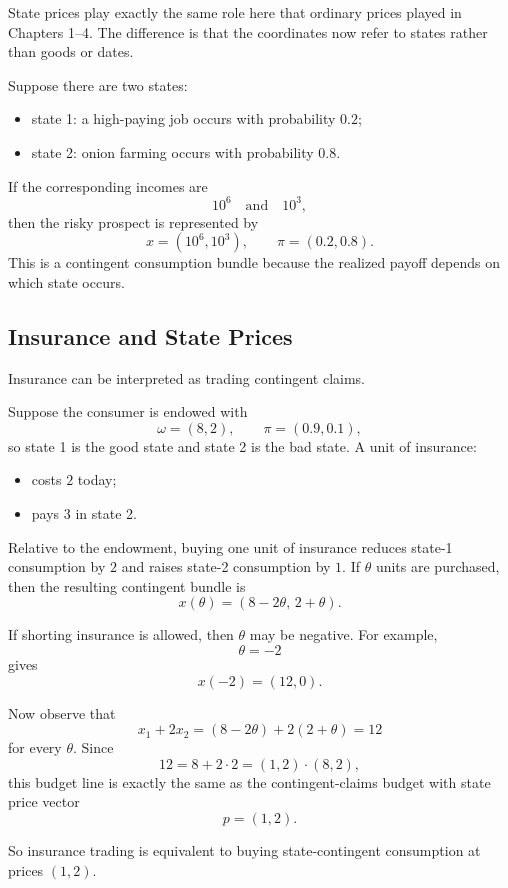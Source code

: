 State prices play exactly the same role here that ordinary prices played in Chapters 1--4. The difference is that the coordinates now refer to states rather than goods or dates.

\begin{examplebox}[title={Worked Example: contingent consumption from an uncertain career outcome}]
Suppose there are two states:
\begin{itemize}
    \item state 1: a high-paying job occurs with probability $0.2$;
    \item state 2: onion farming occurs with probability $0.8$.
\end{itemize}
If the corresponding incomes are
\[
10^6 \quad \text{and} \quad 10^3,
\]
then the risky prospect is represented by
\[
x=(10^6,10^3),
\qquad
\pi=(0.2,0.8).
\]
This is a contingent consumption bundle because the realized payoff depends on which state occurs.
\end{examplebox}

\subsection{Insurance and State Prices}

Insurance can be interpreted as trading contingent claims.

\begin{examplebox}[title={Worked Example: insurance as contingent consumption}]
Suppose the consumer is endowed with
\[
\omega=(8,2),
\qquad
\pi=(0.9,0.1),
\]
so state 1 is the good state and state 2 is the bad state. A unit of insurance:
\begin{itemize}
    \item costs $2$ today;
    \item pays $3$ in state 2.
\end{itemize}

Relative to the endowment, buying one unit of insurance reduces state-1 consumption by $2$ and raises state-2 consumption by $1$. If $\theta$ units are purchased, then the resulting contingent bundle is
\[
x(\theta) = (8-2\theta,\, 2+\theta).
\]

If shorting insurance is allowed, then $\theta$ may be negative. For example,
\[
\theta=-2
\]
gives
\[
x(-2)=(12,0).
\]

Now observe that
\[
x_1 + 2x_2 = (8-2\theta)+2(2+\theta)=12
\]
for every $\theta$. Since
\[
12 = 8 + 2\cdot 2 = (1,2)\cdot (8,2),
\]
this budget line is exactly the same as the contingent-claims budget with state price vector
\[
\boxed{p=(1,2).}
\]

So insurance trading is equivalent to buying state-contingent consumption at prices $(1,2)$.
\end{examplebox}

